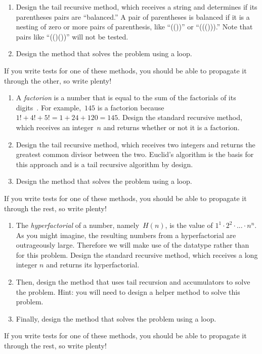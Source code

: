 \begin{enumerate}[label=(\alph*)]
    \item Design the  tail recursive method, which receives a string and determines if its parentheses pairs are ``balanced.'' A pair of parentheses is balanced if it is a nesting of zero or more pairs of parenthesis, like ``(())'' or ``((())).'' Note that pairs like ``(()())'' will not be tested.
    \item Design the  method that solves the problem using a loop.
\end{enumerate}
If you write tests for one of these methods, you should be able to propagate it through the other, so write plenty!

\begin{enumerate}[label=(\alph*)]
    \item A \textit{factorion} is a number that is equal to the sum of the factorials of its digits~. 
    For example,~$145$ is a factorion because $1! + 4! + 5! = 1 + 24 + 120 = 145$. 
    Design the standard recursive  method, which receives an integer~$n$ and returns whether or not it is a factorion. 
    \item Design the  tail recursive method, which receives two integers and returns the greatest common divisor between the two. Euclid's algorithm is the basis for this approach and is a tail recursive algorithm by design.
    \item Design the  method that solves the problem using a loop.
\end{enumerate}
If you write tests for one of these methods, you should be able to propagate it through the rest, so write plenty!


\begin{enumerate}[label=(\alph*)]
    \item The \emph{hyperfactorial} of a number, namely~$H(n)$, is the value of $1^1 \cdot 2^2 \cdot ... \cdot n^n$. As you might imagine, the resulting numbers from a hyperfactorial are outrageously large. Therefore we will make use of the  datatype rather than  for this problem. 
    Design the standard recursive  method, which receives a long integer $n$ and returns its hyperfactorial.
    \item Then, design the  method that uses tail recursion and accumulators to solve the problem. Hint: you will need to design a  helper method to solve this problem.
    \item Finally, design the  method that solves the problem using a loop.
\end{enumerate}
If you write tests for one of these methods, you should be able to propagate it through the rest, so write plenty!

